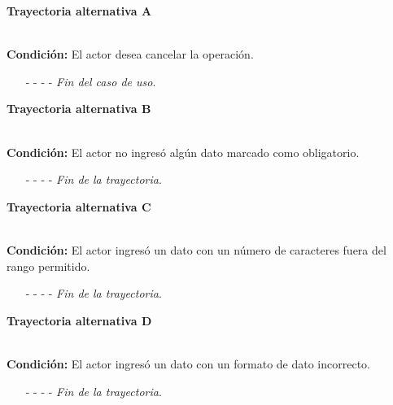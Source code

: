 \hypertarget{CU7-1:TAA}{\textbf{Trayectoria alternativa A}}\\
\noindent \textbf{Condición:} El actor desea cancelar la operación.
\begin{enumerate}
	\UCpaso[\UCactor] Solicita cancelar la operación oprimiendo el botón  de la pantalla 
	\UCpaso[\UCsist] Muestra la pantalla .
	\item[- -] - - {\em {Fin del caso de uso}}.%
\end{enumerate}
\hypertarget{CU7-1:TAB}{\textbf{Trayectoria alternativa B}}\\
\noindent \textbf{Condición:} El actor no ingresó algún dato marcado como obligatorio.
\begin{enumerate}
	\UCpaso[\UCsist] Muestra el mensaje  señalando el campo que presenta el error en la pantalla .
	\UCpaso Regresa al paso \ref{CU7.1-P3} de la trayectoria principal.
	\item[- -] - - {\em {Fin de la trayectoria}}.%
\end{enumerate}
\hypertarget{CU7-1:TAC}{\textbf{Trayectoria alternativa C}}\\
\noindent \textbf{Condición:} El actor ingresó un dato con un número de caracteres fuera del rango permitido.
\begin{enumerate}
	\UCpaso[\UCsist] Muestra el mensaje  señalando el campo que presenta el error en la pantalla .
	\UCpaso Regresa al paso \ref{CU7.1-P3} de la trayectoria principal.
	\item[- -] - - {\em {Fin de la trayectoria}}.%
\end{enumerate}
\hypertarget{CU7-1:TAD}{\textbf{Trayectoria alternativa D}}\\
\noindent \textbf{Condición:} El actor ingresó un dato con un formato de dato incorrecto.
\begin{enumerate}
	\UCpaso[\UCsist] Muestra el mensaje  señalando el campo que presenta el error en la pantalla .
	\UCpaso Regresa al paso \ref{CU7.1-P3} de la trayectoria principal.
	\item[- -] - - {\em {Fin de la trayectoria}}.
\end{enumerate}
